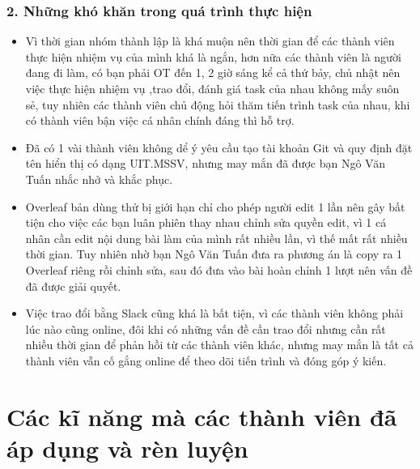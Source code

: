 \documentclass[12pt]{report}
\begin{document}
\subsection*{2. Những khó khăn trong quá trình thực hiện}
\begin{itemize}
    \item Vì thời gian nhóm thành lập là khá muộn nên thời gian để các thành viên thực hiện nhiệm vụ của mình khá là ngắn, hơn nữa các thành viên là người đang đi làm, có bạn phải OT đến 1, 2 giờ sáng kể cả thứ bảy, chủ nhật nên việc thực hiện nhiệm vụ ,trao đổi, đánh giá task của nhau không mấy suôn sẻ, tuy nhiên các thành viên chủ động hỏi thăm tiến trình task của nhau, khi có thành viên bận việc cá nhân chính đáng thì hỗ trợ.
    \item Đã có 1 vài thành viên không dể ý yêu cầu tạo tài khoản Git và quy định đặt tên hiển thị có dạng UIT.MSSV, nhưng may mắn đã được bạn Ngô Văn Tuấn nhắc nhở và khắc phục.
    \item  Overleaf bản dùng thử bị giới hạn chỉ cho phép người edit 1 lần nên gây bất tiện cho việc các bạn luân phiên thay nhau chỉnh sửa quyền edit, vì 1 cá nhân cần edit nội dung bài làm của mình rất nhiều lần, vì thế mất rất nhiều thời gian. Tuy nhiên nhờ bạn Ngô Văn Tuấn đưa ra phương án là copy ra 1 Overleaf riêng rồi chỉnh sửa, sau đó đưa vào bài hoàn chỉnh 1 lượt nên vấn đề đã được giải quyết.
    \item Việc trao đổi bằng Slack cũng khá là bất tiện, vì các thành viên không phải lúc nào cũng online, đôi khi có những vấn đề cần trao đổi nhưng cần rất nhiều thời gian để phản hồi từ các thành viên khác, nhưng may mắn là tất cả thành viên vẫn cố gắng online để theo dõi tiến trình và đóng góp ý kiến.

\end{itemize}


\chapter{Các kĩ năng mà các thành viên đã áp dụng và rèn luyện}
\label{sec:used_skills}
\end{document}
